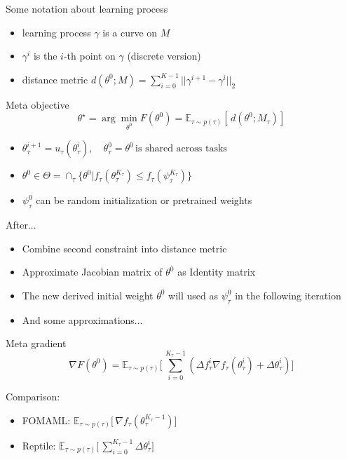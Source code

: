 \documentclass{beamer}
\begin{document}
\begin{frame}{Some notation about learning process}
  \begin{itemize}
    \item learning process $\gamma$ is a curve on $M$
    \item $\gamma^i$ is the $i$-th point on $\gamma$ (discrete version)
    \item distance metric $d(\theta^0;M) = \sum_{i=0}^{K-1} ||\gamma^{i+1} - \gamma^i||_2$
  \end{itemize}
\end{frame}

\begin{frame}
  \begin{block}{Meta objective}
  \[
    \theta^{\star} = \arg\min_{\theta^0} F(\theta^0) = \mathbb{E}_{\tau \sim p(\tau)} [\, d(\theta^0;M_\tau) ]\,
  \]
  \end{block}

  \begin{itemize}
    \item $\theta_{\tau}^{i+1} = u_\tau(\theta^i_\tau), \quad \theta_\tau^0 = \theta^0 \, \text{is shared across tasks}$
    \item $\theta^0 \in \Theta = \cap_\tau \lbrace \theta^0 | f_\tau(\theta_\tau^{K_\tau}) \leq f_\tau(\psi_\tau^{K_\tau}) \rbrace$
    \item $\psi_\tau^0$ can be random initialization or pretrained weights
  \end{itemize}
\end{frame}

\begin{frame}{After...}
  \begin{itemize}
    \item Combine second constraint into distance metric
    \item Approximate Jacobian matrix of $\theta^0$ as Identity matrix
    \item The new derived initial weight $\theta^0$ will used as $\psi_\tau^0$ in the following iteration
    \item And some approximations...
  \end{itemize}
\end{frame}

\begin{frame}{Meta gradient}
  \[
    \nabla F(\theta^0) = \mathbb{E}_{\tau \sim p(\tau)} \Big [\, \sum_{i=0}^{K_\tau - 1} (\Delta f_\tau^i \nabla f_\tau(\theta_\tau^i) + \Delta \theta_\tau^i ) \Big]\,
  \]

  Comparison:
  \begin{itemize}
    \item FOMAML: $\mathbb{E}_{\tau \sim p(\tau)} \Big [\, \nabla f_\tau(\theta^{K_\tau -1}_\tau) \Big ]\,$ 
    \item Reptile: $\mathbb{E}_{\tau \sim p(\tau)} \Big [\, \sum_{i=0}^{K_\tau - 1} \Delta \theta_\tau^i \Big ]\,$
  \end{itemize}
\end{frame}
\end{document}
